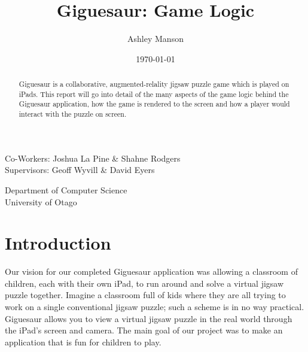 \documentclass{article}
\begin{document}
\title{Giguesaur: Game Logic}
\author{Ashley Manson}
\date{\today}

\begin{titlepage}
\clearpage
\maketitle
\thispagestyle{empty} %

\begin{center}
\large 
Co-Workers: Joshua La Pine \& Shahne Rodgers\\
Supervisors: Geoff Wyvill \& David Eyers\\

\vspace*{1\baselineskip} %

Department of Computer Science\\
University of Otago

\end{center}

\end{titlepage}


\begin{abstract}
Giguesaur is a collaborative, augmented-relality jigsaw puzzle game which is
played on iPads. This report will go into detail of the many aspects of the game
logic behind the Giguesaur application, how the game is rendered to the screen
and how a player would interact with the puzzle on screen.
\end{abstract}


\clearpage
\tableofcontents
\clearpage

\setcounter{page}{1}


\section{Introduction}

Our vision for our completed Giguesaur application was allowing a classroom of
children, each with their own iPad, to run around and solve a virtual jigsaw
puzzle together. Imagine a classroom full of kids where they are all trying to
work on a single conventional jigsaw puzzle; such a scheme is in no way
practical. Giguesaur allows you to view a virtual jigsaw puzzle in the real
world through the iPad's screen and camera. The main goal of our project was to
make an application that is fun for children to play.
\end{document}
